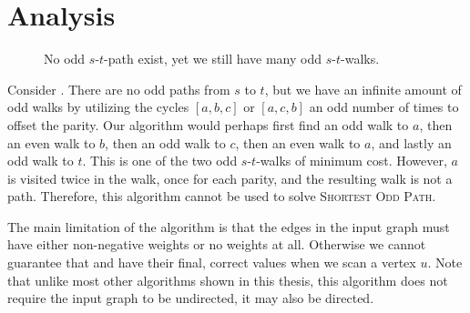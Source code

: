 \section{Analysis}

\begin{figure}
    \centering
    \caption{No odd $s$-$t$-path exist, yet we still have many odd $s$-$t$-walks.}
    \label{figure:small2}
 \end{figure}

Consider . There are no odd paths from $s$ to $t$, but we have an infinite amount of odd walks by utilizing the cycles $[a,b,c]$ or $[a,c,b]$ an odd number of times to offset the parity. Our algorithm would perhaps first find an odd walk to $a$, then an even walk to $b$, then an odd walk to $c$, then an even walk to $a$, and lastly an odd walk to $t$. This is one of the two odd $s$-$t$-walks of minimum cost. However, $a$ is visited twice in the walk, once for each parity, and the resulting walk is not a path. Therefore, this algorithm cannot be used to solve \textsc{Shortest Odd Path}.

The main limitation of the algorithm is that the edges in the input graph must have either non-negative weights or no weights at all. Otherwise we cannot guarantee that  and  have their final, correct values when we scan a vertex $u$. Note that unlike most other algorithms shown in this thesis, this algorithm does not require the input graph to be undirected, it may also be directed.

